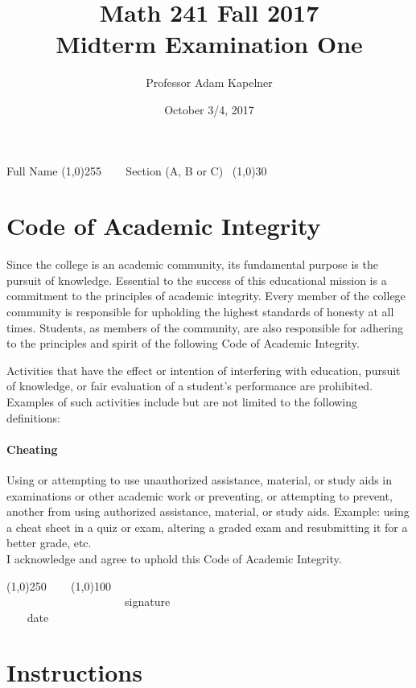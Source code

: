 \documentclass[12pt]{article}
\title{Math 241 Fall 2017 \\ Midterm Examination One}
\author{Professor Adam Kapelner}
\date{October 3/4, 2017}
\begin{document}
\maketitle

\noindent Full Name \line(1,0){255} ~~~ Section (A, B or C)~ \line(1,0){30}

\thispagestyle{empty}

\section*{Code of Academic Integrity}

\footnotesize
Since the college is an academic community, its fundamental purpose is the pursuit of knowledge. Essential to the success of this educational mission is a commitment to the principles of academic integrity. Every member of the college community is responsible for upholding the highest standards of honesty at all times. Students, as members of the community, are also responsible for adhering to the principles and spirit of the following Code of Academic Integrity.

Activities that have the effect or intention of interfering with education, pursuit of knowledge, or fair evaluation of a student's performance are prohibited. Examples of such activities include but are not limited to the following definitions:

\paragraph{Cheating} Using or attempting to use unauthorized assistance, material, or study aids in examinations or other academic work or preventing, or attempting to prevent, another from using authorized assistance, material, or study aids. Example: using a cheat sheet in a quiz or exam, altering a graded exam and resubmitting it for a better grade, etc.
\\

\noindent I acknowledge and agree to uphold this Code of Academic Integrity. \\

\begin{center}
\line(1,0){250} ~~~ \line(1,0){100}\\
~~~~~~~~~~~~~~~~~~~~~signature~~~~~~~~~~~~~~~~~~~~~~~~~~~~~~~~~~~~~~~~~~~~~ date
\end{center}

\normalsize

\section*{Instructions}
\end{document}
